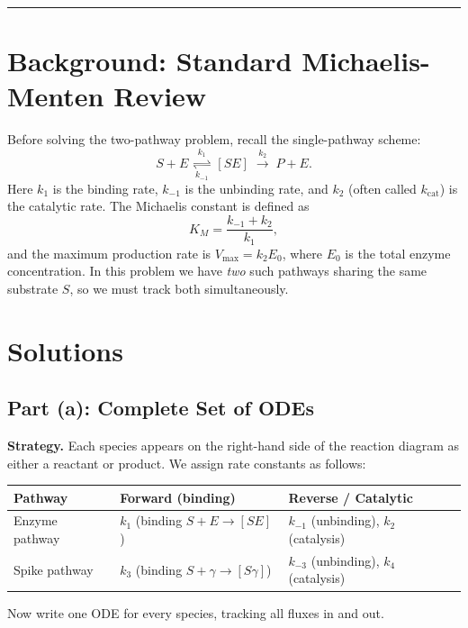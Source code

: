 \documentclass[12pt]{article}
\begin{document}
\vspace{1.5em}
\hrule
\vspace{1.5em}


\section*{Background: Standard Michaelis-Menten Review}

Before solving the two-pathway problem, recall the single-pathway scheme:
\[
  S + E \;\underset{k_{-1}}{\overset{k_1}{\rightleftharpoons}}\; [SE] \;\overset{k_2}{\longrightarrow}\; P + E.
\]
Here $k_1$ is the binding rate, $k_{-1}$ is the unbinding rate, and $k_2$ (often called
$k_{\text{cat}}$) is the catalytic rate. The Michaelis constant is defined as
\[
  K_M = \frac{k_{-1} + k_2}{k_1},
\]
and the maximum production rate is $V_{\max} = k_2 E_0$, where $E_0$ is the total enzyme
concentration.  In this problem we have \emph{two} such pathways sharing the same substrate
$S$, so we must track both simultaneously.

\vspace{1em}


\section*{Solutions}

\subsection*{Part (a): Complete Set of ODEs}

\begin{mdframed}[style=solutionbox]
\textbf{\color{solutiongreen}Strategy.}
Each species appears on the right-hand side of the reaction diagram as either a reactant or
product. We assign rate constants as follows:

\medskip
\begin{center}
\renewcommand{\arraystretch}{1.4}
\begin{tabular}{@{}lll@{}}
\toprule
\textbf{Pathway} & \textbf{Forward (binding)} & \textbf{Reverse / Catalytic} \\
\midrule
Enzyme pathway   & $k_1$ (binding $S+E \to [SE]$)   & $k_{-1}$ (unbinding), $k_2$ (catalysis) \\
Spike pathway    & $k_3$ (binding $S+\gamma \to [S\gamma]$) & $k_{-3}$ (unbinding), $k_4$ (catalysis) \\
\bottomrule
\end{tabular}
\end{center}

\medskip
Now write one ODE for every species, tracking all fluxes in and out.
\end{mdframed}
\end{document}
